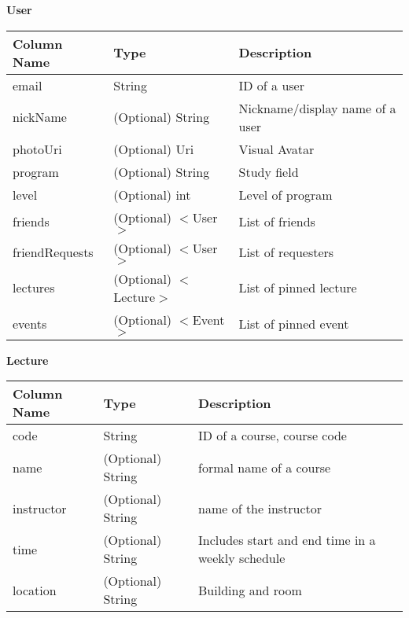 \documentclass[12pt, titlepage]{article}
\begin{document}
\begin{itemize}
\quad \textbf{User}
\begin{table}[H]
	\begin{tabular}{|p{}|p{}|p{}|}
		\hline
		\textbf{Column Name} & \textbf{Type}  & \textbf{Description}                  \\
		\hline
		email                   & String                & ID of a user                        \\
		\hline
		nickName           & (Optional) String                & Nickname/display name of a user      \\
		\hline
		photoUri           & (Optional) Uri                & Visual Avatar       \\
		\hline
		program            & (Optional) String                & Study field                \\
		\hline
		level             & (Optional) int                & Level of program                 \\
		\hline
		friends          &  (Optional) $<$User$>$                & List of friends \\
		\hline
		friendRequests          &  (Optional) $<$User$>$                & List of requesters              \\
		\hline
		lectures                & (Optional) $<$Lecture$>$                & List of pinned lecture                     \\
		\hline
		events                & (Optional) $<$Event$>$                & List of pinned event                     \\			
		\hline
\end{tabular}
\end{table}

\textbf{Lecture}
\begin{table}[H]
	\begin{tabular}{|p{}|p{}|p{}|}
		\hline
		\textbf{Column Name} & \textbf{Type}  & \textbf{Description}                  \\
		\hline
		code                   & String                & ID of a course, course code\\
		\hline
		name           & (Optional) String     & formal name of a course      \\
		\hline
		instructor           & (Optional) String      & name of the instructor       \\
		\hline
		time            & (Optional) String                & Includes start and end time in a weekly schedule  \\
		\hline
		location             & (Optional) String                & Building and room                 \\
		\hline
\end{tabular}
\end{table}


\end{itemize}
\end{document}
